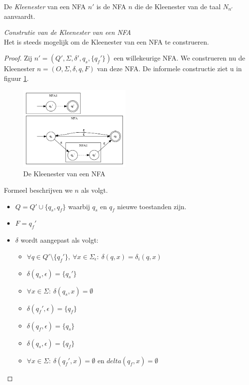 \documentclass[main.tex]{subfiles}
\begin{document}
\begin{de}
  De \emph{Kleenester} van een NFA $n'$ is de NFA $n$ die de Kleenester van de taal $N_{n'}$ aanvaardt.
\end{de}

\begin{st}
  \emph{Construtie van de Kleenester van een NFA}\\
  Het is steeds mogelijk om de Kleenester van een NFA te construeren.

  \begin{proof}
    Zij $n' = (Q',\Sigma,\delta',q_{s},\{q_{f}'\})$ een willekeurige NFA. We construeren nu de Kleenester $n = (O,\Sigma,\delta,q,F)$ van deze NFA.
    De informele constructie ziet u in figuur \ref{fig:nfa_kleene}.
    \begin{figure}[H]
      \centering
      \includegraphics[width=0.5\textwidth]{assets/nfa_kleene.png}      
      \caption{De Kleenester van een NFA}
      \label{fig:nfa_kleene}
    \end{figure}
    Formeel beschrijven we $n$ als volgt.
    \begin{itemize}
    \item $Q = Q' \cup \{ q_{s}, q_{f} \}$ waarbij $q_{s}$ en $q_{f}$ nieuwe toestanden zijn.
    \item $F = {q_{f}'}$
    \item $\delta$ wordt aangepast als volgt:
      \begin{itemize}
      \item $\forall q \in Q'\setminus\{q_{f}'\},\ \forall x \in \Sigma_{\epsilon}:\ \delta(q,x) = \delta_{i}(q,x)$
      \item $\delta(q_{s},\epsilon) = \{q_{s}'\}$
      \item $\forall x \in \Sigma:\ \delta(q_{s},x) = \emptyset$
      \item $\delta(q_{f}',\epsilon) = \{q_{f}\}$
      \item $\delta(q_{f},\epsilon) = \{q_{s}\}$
      \item $\delta(q_{s},\epsilon) = \{q_{f}\}$
      \item $\forall x \in \Sigma:\ \delta(q_{f}',x) = \emptyset$ en $delta(q_{f},x) = \emptyset$
      \end{itemize}
    \end{itemize}
  \end{proof}
\end{st}
\end{document}

